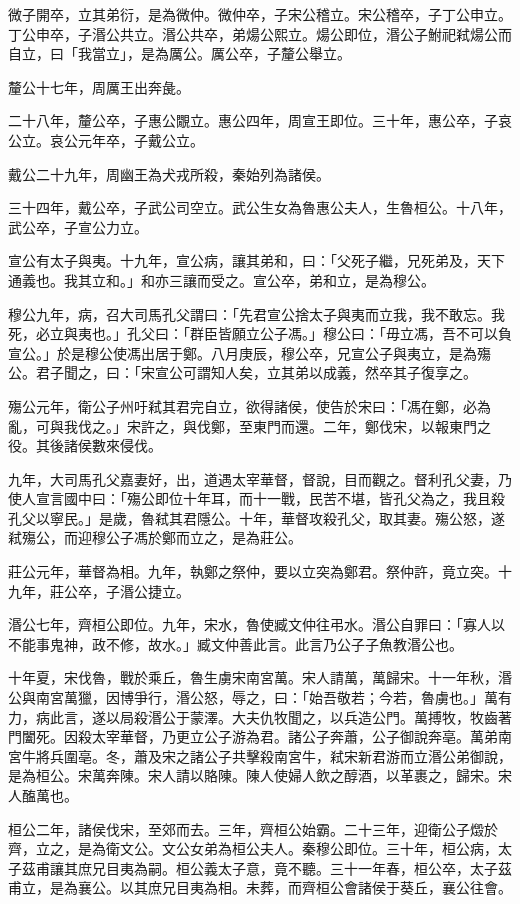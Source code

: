 \begin{pinyinscope}
微子開卒，立其弟衍，是為微仲。微仲卒，子宋公稽立。宋公稽卒，子丁公申立。丁公申卒，子湣公共立。湣公共卒，弟煬公熙立。煬公即位，湣公子鮒祀弒煬公而自立，曰「我當立」，是為厲公。厲公卒，子釐公舉立。

釐公十七年，周厲王出奔彘。

二十八年，釐公卒，子惠公覵立。惠公四年，周宣王即位。三十年，惠公卒，子哀公立。哀公元年卒，子戴公立。

戴公二十九年，周幽王為犬戎所殺，秦始列為諸侯。

三十四年，戴公卒，子武公司空立。武公生女為魯惠公夫人，生魯桓公。十八年，武公卒，子宣公力立。

宣公有太子與夷。十九年，宣公病，讓其弟和，曰：「父死子繼，兄死弟及，天下通義也。我其立和。」和亦三讓而受之。宣公卒，弟和立，是為穆公。

穆公九年，病，召大司馬孔父謂曰：「先君宣公捨太子與夷而立我，我不敢忘。我死，必立與夷也。」孔父曰：「群臣皆願立公子馮。」穆公曰：「毋立馮，吾不可以負宣公。」於是穆公使馮出居于鄭。八月庚辰，穆公卒，兄宣公子與夷立，是為殤公。君子聞之，曰：「宋宣公可謂知人矣，立其弟以成義，然卒其子復享之。

殤公元年，衛公子州吁弒其君完自立，欲得諸侯，使告於宋曰：「馮在鄭，必為亂，可與我伐之。」宋許之，與伐鄭，至東門而還。二年，鄭伐宋，以報東門之役。其後諸侯數來侵伐。

九年，大司馬孔父嘉妻好，出，道遇太宰華督，督說，目而觀之。督利孔父妻，乃使人宣言國中曰：「殤公即位十年耳，而十一戰，民苦不堪，皆孔父為之，我且殺孔父以寧民。」是歲，魯弒其君隱公。十年，華督攻殺孔父，取其妻。殤公怒，遂弒殤公，而迎穆公子馮於鄭而立之，是為莊公。

莊公元年，華督為相。九年，執鄭之祭仲，要以立突為鄭君。祭仲許，竟立突。十九年，莊公卒，子湣公捷立。

湣公七年，齊桓公即位。九年，宋水，魯使臧文仲往弔水。湣公自罪曰：「寡人以不能事鬼神，政不修，故水。」臧文仲善此言。此言乃公子子魚教湣公也。

十年夏，宋伐魯，戰於乘丘，魯生虜宋南宮萬。宋人請萬，萬歸宋。十一年秋，湣公與南宮萬獵，因博爭行，湣公怒，辱之，曰：「始吾敬若；今若，魯虜也。」萬有力，病此言，遂以局殺湣公于蒙澤。大夫仇牧聞之，以兵造公門。萬搏牧，牧齒著門闔死。因殺太宰華督，乃更立公子游為君。諸公子奔蕭，公子御說奔亳。萬弟南宮牛將兵圍亳。冬，蕭及宋之諸公子共擊殺南宮牛，弒宋新君游而立湣公弟御說，是為桓公。宋萬奔陳。宋人請以賂陳。陳人使婦人飲之醇酒，以革裹之，歸宋。宋人醢萬也。

桓公二年，諸侯伐宋，至郊而去。三年，齊桓公始霸。二十三年，迎衛公子燬於齊，立之，是為衛文公。文公女弟為桓公夫人。秦穆公即位。三十年，桓公病，太子茲甫讓其庶兄目夷為嗣。桓公義太子意，竟不聽。三十一年春，桓公卒，太子茲甫立，是為襄公。以其庶兄目夷為相。未葬，而齊桓公會諸侯于葵丘，襄公往會。


\end{pinyinscope}
